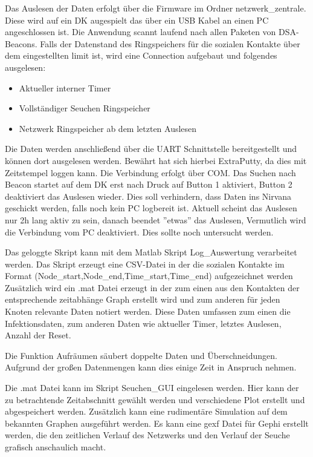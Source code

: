 \documentclass[11pt,ngerman]{scrartcl} %
\begin{document}
Das Auslesen der Daten erfolgt über die Firmware im Ordner netzwerk\_zentrale. Diese wird auf ein DK augespielt das über ein USB Kabel an einen PC angeschlossen ist. Die Anwendung scannt laufend nach allen Paketen von DSA-Beacons. Falls der Datenstand des Ringspeichers für die sozialen Kontakte über dem eingestellten limit ist, wird eine Connection aufgebaut und folgendes ausgelesen:
\begin{itemize}
\item Aktueller interner Timer
\item Vollständiger Seuchen Ringspeicher
\item Netzwerk Ringspeicher ab dem letzten Auslesen
\end{itemize}

Die Daten werden anschließend über die UART Schnittstelle bereitgestellt und können dort ausgelesen werden. Bewährt hat sich hierbei ExtraPutty, da dies mit Zeitstempel loggen kann. Die Verbindung erfolgt über COM.
Das Suchen nach Beacon startet auf dem DK erst nach Druck auf Button 1 aktiviert, Button 2 deaktiviert das Auslesen wieder. Dies soll verhindern, dass Daten ins Nirvana geschickt werden, falls noch kein PC logbereit ist.
Aktuell scheint das Auslesen nur 2h lang aktiv zu sein, danach beendet ''etwas'' das Auslesen, Vermutlich wird die Verbindung vom PC deaktiviert. Dies sollte noch untersucht werden.

Das geloggte Skript kann mit dem Matlab Skript Log\_Auswertung verarbeitet werden. Das Skript erzeugt eine CSV-Datei in der die sozialen Kontakte im Format (Node\_start,Node\_end,Time\_start,Time\_end)  aufgezeichnet werden
Zusätzlich wird ein .mat Datei erzeugt in der zum einen aus den Kontakten der entsprechende zeitabhänge Graph erstellt wird und zum anderen für jeden Knoten relevante Daten notiert werden. Diese Daten umfassen zum einen die Infektionsdaten, zum anderen Daten wie aktueller Timer, letztes Auslesen, Anzahl der Reset. 

Die Funktion Aufräumen säubert doppelte Daten und Überschneidungen. Aufgrund der großen Datenmengen kann dies einige Zeit in Anspruch nehmen.

Die .mat Datei kann im Skript Seuchen\_GUI eingelesen werden. Hier kann der zu betrachtende Zeitabschnitt gewählt werden und verschiedene Plot erstellt und abgespeichert werden. Zusätzlich kann eine rudimentäre Simulation auf dem bekannten Graphen ausgeführt werden.
Es kann eine gexf Datei für Gephi erstellt werden, die den zeitlichen Verlauf des Netzwerks und den Verlauf der Seuche grafisch anschaulich macht.
\end{document}
